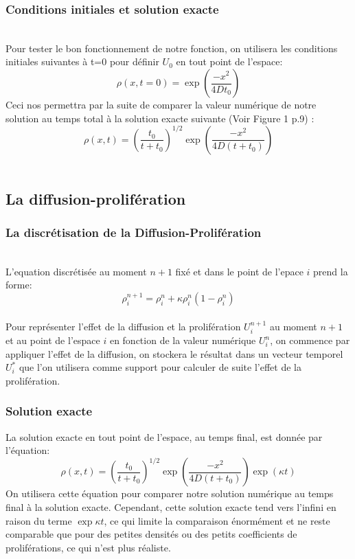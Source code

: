 \documentclass[12pt,a4paper]{article}
\begin{document}
\subsubsection{Conditions initiales et solution exacte}  
\\
Pour tester le bon fonctionnement de notre fonction, on utilisera les conditions initiales suivantes à t=0 pour définir $U_0$ en tout point de l'espace: 
\begin{equation}
    \rho(x,t=0) = \exp{(\frac{-x^2}{4Dt_0})} 
\end{equation}
Ceci nos permettra par la suite de comparer la valeur numérique de notre solution au 
temps total à la solution exacte suivante (Voir Figure 1 p.9) : 
\begin{equation}
    \rho(x,t)= (\frac{t_0}{t+t_0})^{1/2} \exp{(\frac{-x^2}{4D(t+t_0)})}
\end{equation}
\\
\subsection{La diffusion-prolifération} 
\subsubsection{La discrétisation de la Diffusion-Prolifération} 
\\
L'equation discrétisée au moment $n+1$ fixé et dans le point de 
l'epace $i$ prend la forme: 
\begin{equation}
    \rho^{n+1}_i = \rho^{n}_i + \kappa\rho^{n}_i (1-\rho^{n}_i)
\end{equation}
\\
Pour représenter l'effet de la diffusion et la prolifération
$U^{n+1}_i$ au moment $n+1$ et au point de l'espace $i$ en fonction de 
la valeur numérique $U^n_i$, on commence par appliquer l'effet de la 
diffusion, on stockera le résultat dans un vecteur temporel $U^{*}_i$ 
que l'on utilisera comme support pour calculer de suite l'effet de la 
prolifération. 
\\
\subsubsection{Solution exacte}

La solution exacte en tout point de l'espace, au temps final, est
donnée par l'équation: 
\begin{equation}
    \rho(x,t)= (\frac{t_0}{t+t_0})^{1/2} \exp{(\frac{-x^2}{4D(t+t_0)})}\exp{(\kappa t)}
\end{equation}
On utilisera cette équation pour comparer notre solution numérique
au temps final à la solution exacte. Cependant, cette solution 
exacte tend vers l'infini en raison du terme $\exp{\kappa t}$, ce
qui limite la comparaison énormément et ne reste comparable que pour des petites densités ou des petits coefficients de proliférations, ce qui n'est plus réaliste.  
\end{document}
